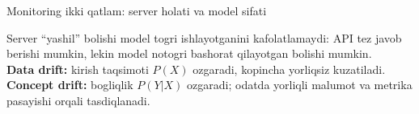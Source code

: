 \documentclass[aspectratio=169,11pt]{beamer}
\newcommand{\uzq}{\textquotesingle{}}   %
\begin{document}
\begin{frame}{Monitoring ikki qatlam: server holati va model sifati}
  \vspace{6pt}

  \begin{tcolorbox}[warnbox,title={Asosiy farq --- nega ikkalasi kerak?},top=2pt,bottom=2pt,left=4pt,right=4pt]
    \footnotesize
    Server ``yashil'' bo\uzq{}lishi model to\uzq{}g\uzq{}ri ishlayotganini kafolatlamaydi:
    API tez javob berishi mumkin, lekin model noto\uzq{}g\uzq{}ri bashorat qilayotgan
    bo\uzq{}lishi mumkin.\\[2pt]
    \textbf{Data drift:} kirish taqsimoti $P(X)$ o\uzq{}zgaradi, ko\uzq{}pincha
    yorliqsiz kuzatiladi.
    \textbf{Concept drift:} bog\uzq{}liqlik $P(Y|X)$ o\uzq{}zgaradi; odatda
    yorliqli ma\uzq{}lumot va metrika pasayishi orqali tasdiqlanadi.
  \end{tcolorbox}
\end{frame}
\end{document}
